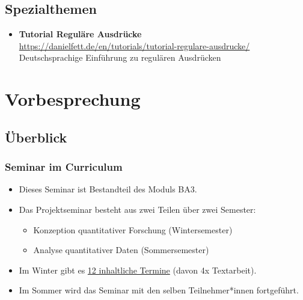\documentclass[11pt,german,a4paper]{article}
\providecommand{\tightlist}{%
  \setlength{\itemsep}{0pt}\setlength{\parskip}{0pt}}
\begin{document}
\hypertarget{spezialthemen}{%
\subsection*{Spezialthemen}\label{spezialthemen}}

\begin{itemize}
\tightlist
\item
  \textbf{Tutorial Reguläre Ausdrücke}\\
  \url{https://danielfett.de/en/tutorials/tutorial-regulare-ausdrucke/}~\\
  Deutschsprachige Einführung zu regulären Ausdrücken
\end{itemize}

\hypertarget{vorbesprechung}{%
\section{Vorbesprechung}\label{vorbesprechung}}

\hypertarget{uxfcberblick}{%
\subsection*{Überblick}\label{uxfcberblick}}

\hypertarget{seminar-im-curriculum}{%
\subsubsection{Seminar im Curriculum}\label{seminar-im-curriculum}}

\begin{itemize}
\tightlist
\item
  Dieses Seminar ist Bestandteil des Moduls BA3.
\item
  Das Projektseminar besteht aus zwei Teilen über zwei Semester:

  \begin{itemize}
  \tightlist
  \item
    Konzeption quantitativer Forschung (Wintersemester)
  \item
    Analyse quantitativer Daten (Sommersemester)
  \end{itemize}
\item
  Im Winter gibt es \protect\hyperlink{terminuxfcberblick}{12 inhaltliche Termine} (davon 4x Textarbeit).
\item
  Im Sommer wird das Seminar mit den selben Teilnehmer*innen fortgeführt.
\end{itemize}
\end{document}
